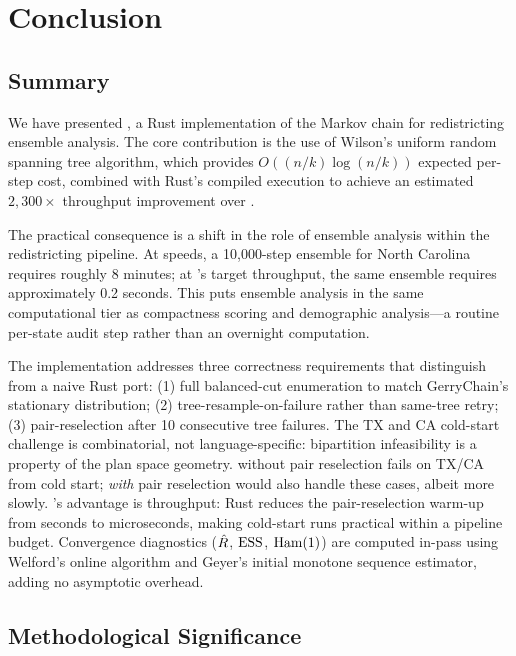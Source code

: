 \section{Conclusion}
\label{sec:conclusion}

\subsection{Summary}

We have presented \re{}, a Rust implementation of the \recom{} Markov
chain for redistricting ensemble analysis.
The core contribution is the use of Wilson's uniform random spanning tree
algorithm, which provides $O((n/k)\log(n/k))$ expected per-step cost,
combined with Rust's compiled execution to achieve an estimated
$2{,}300\times$ throughput improvement over \gc{}.

The practical consequence is a shift in the role of ensemble analysis
within the redistricting pipeline.
At \gc{} speeds, a 10{,}000-step ensemble for North Carolina requires
roughly 8 minutes; at \re{}'s target throughput, the same ensemble
requires approximately 0.2 seconds.
This puts ensemble analysis in the same computational tier as compactness
scoring and demographic analysis---a routine per-state audit step rather
than an overnight computation.

The implementation addresses three correctness requirements that
distinguish \re{} from a naive Rust port:
(1) full balanced-cut enumeration to match GerryChain's stationary
distribution;
(2) tree-resample-on-failure rather than same-tree retry;
(3) pair-reselection after 10 consecutive tree failures.
The TX and CA cold-start challenge is combinatorial, not language-specific:
bipartition infeasibility is a property of the plan space geometry.
\gc{} without pair reselection fails on TX/CA from cold start; \gc{}
\emph{with} pair reselection would also handle these cases, albeit more slowly.
\re{}'s advantage is throughput: Rust reduces the pair-reselection warm-up
from seconds to microseconds, making cold-start runs practical within a
pipeline budget.
Convergence diagnostics ($\hat{R}$, $\mathrm{ESS}$, $\mathrm{Ham}(1)$) are computed
in-pass using Welford's online algorithm and Geyer's initial monotone
sequence estimator, adding no asymptotic overhead.

\subsection{Methodological Significance}

